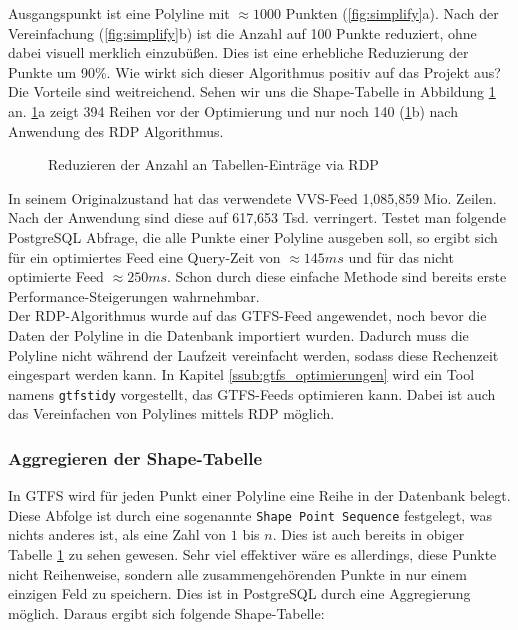     Ausgangspunkt ist eine Polyline mit $\approx1000$ Punkten (\ref{fig:simplify}a). Nach der Vereinfachung (\ref{fig:simplify}b) ist die Anzahl auf 100 Punkte reduziert, ohne dabei visuell merklich einzubüßen. Dies ist eine erhebliche Reduzierung der Punkte um 90\%. Wie wirkt sich dieser Algorithmus positiv auf das Projekt aus? Die Vorteile sind weitreichend. Sehen wir uns die Shape-Tabelle in Abbildung \ref{fig:shape_simplify} an. \ref{fig:shape_simplify}a zeigt 394 Reihen vor der Optimierung und nur noch 140 (\ref{fig:shape_simplify}b) nach Anwendung des RDP Algorithmus.

    \begin{figure}[htbp]
      \centering
      \hfill
      \caption{Reduzieren der Anzahl an Tabellen-Einträge via RDP}
      \label{fig:shape_simplify}
    \end{figure}

    In seinem Originalzustand hat das verwendete VVS-Feed 1,085,859 Mio. Zeilen. Nach der Anwendung sind diese auf 617,653 Tsd. verringert. Testet man folgende PostgreSQL Abfrage,
    \colorbox{materialGrey}{\texttt{}}
    die alle Punkte einer Polyline ausgeben soll, so ergibt sich für ein optimiertes Feed eine Query-Zeit von $\approx145 ms$ und für das nicht optimierte Feed $\approx250 ms$. Schon durch diese einfache Methode sind bereits erste Performance-Steigerungen wahrnehmbar.\\

    Der RDP-Algorithmus wurde auf das GTFS-Feed angewendet, noch bevor die Daten der Polyline in die Datenbank importiert wurden. Dadurch muss die Polyline nicht während der Laufzeit vereinfacht werden, sodass diese Rechenzeit eingespart werden kann. In Kapitel \ref{ssub:gtfs_optimierungen} wird ein Tool namens \texttt{gtfstidy} vorgestellt, das GTFS-Feeds optimieren kann. Dabei ist auch das Vereinfachen von Polylines mittels RDP möglich.


  \subsubsection{Aggregieren der Shape-Tabelle}
  \label{ssub:aggregieren_der_shape_tabelle}
    In GTFS wird für jeden Punkt einer Polyline eine Reihe in der Datenbank belegt. Diese Abfolge ist durch eine sogenannte \texttt{Shape Point Sequence} festgelegt, was nichts anderes ist, als eine Zahl von $1$ bis $n$. Dies ist auch bereits in obiger Tabelle \ref{fig:shape_simplify} zu sehen gewesen. Sehr viel effektiver wäre es allerdings, diese Punkte nicht Reihenweise, sondern alle zusammengehörenden Punkte in nur einem einzigen Feld zu speichern. Dies ist in PostgreSQL durch eine Aggregierung möglich. Daraus ergibt sich folgende Shape-Tabelle:\\


